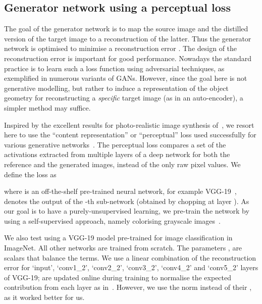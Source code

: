 \documentclass{article}
\begin{document}
 \subsection{Generator network using a perceptual loss}

The goal of the generator network  is to map the source image  and the distilled version  of the target image  to a reconstruction of the latter. Thus the generator network is optimised to minimise a reconstruction error . The design of the reconstruction error is important for good performance. Nowadays the standard practice is to learn such a loss function using adversarial techniques, as exemplified in numerous variants of {GANs}. However, since the goal here is not generative modelling, but rather to induce a representation  of the object geometry for reconstructing a \emph{specific} target image (as in an auto-encoder), a simpler method may suffice.

Inspired by the excellent results for photo-realistic image synthesis of~\cite{chen2017photographic}, we resort here to use the ``content representation'' or ``perceptual'' loss used successfully for various generative networks~\citep{Gatys16,Bruna16,Dosovitskiy16a,Johnson16,Ledig16,Nguyen16,Nguyen17}. The perceptual loss compares a set of the activations extracted from multiple layers of a deep network for both the reference and the generated images, instead of the only raw pixel values. We define the loss as

where  is an off-the-shelf pre-trained neural network, for example VGG-19~\citep{Simonyan14c},  denotes the output of the -th sub-network (obtained by chopping  at layer ). As our goal is to have a purely-unsupervised learning, we pre-train the network by using a self-supervised approach, namely colorising grayscale images~\cite{larsson2016learning}.

We also test using a VGG-19 model pre-trained for image classification in ImageNet. All other networks are trained from scratch. The parameters ,  are scalars that balance the terms. We use a linear combination of the reconstruction error for `input',  `conv1\_2', `conv2\_2', `conv3\_2', `conv4\_2' and `conv5\_2' layers of VGG-19;  are updated online during training to normalise the expected contribution from each layer as in~\cite{chen2017photographic}. However, we use the  norm instead of their , as it worked better for us.
\end{document}
